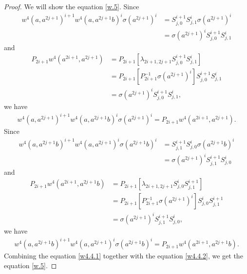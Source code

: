 \documentclass[a4paper,11pt]{amsart}
\numberwithin{equation}{section}
\begin{document}
\begin{proof}
We will show the equation \eqref{w.5}. Since
\begin{align*}
w^4(a,a^{2j+1})^{i+1} w^4(a,a^{2j+1}b)^i \sigma(a^{2j+1})^i&=S_{j,0}^{i+1} S_{j,1}^i \sigma(a^{2j+1})^i\\
&=\sigma(a^{2j+1})^i S_{j,0}^{i+1} S_{j,1}^i
\end{align*}
and
\begin{align*}
P_{2i+1} w^4(a^{2i+1},a^{2j+1})&=P_{2i+1} [\lambda_{2i+1,2j+1} S_{j,0}^{i+1} S_{j,1}^i]\\
&=P_{2i+1} [P_{2i+1}^{-1} \sigma(a^{2j+1})^i] S_{j,0}^{i+1} S_{j,1}^i\\
&=\sigma(a^{2j+1})^i S_{j,0}^{i+1} S_{j,1}^i,
\end{align*}
we have
\begin{align}
\label{w4.4.1} w^4(a,a^{2j+1})^{i+1} w^4(a,a^{2j+1}b)^i \sigma(a^{2j+1})^i=P_{2i+1}w^4(a^{2i+1},a^{2j+1}).
\end{align}
Since
\begin{align*}
w^4(a,a^{2j+1}b)^{i+1} w^4(a,a^{2j+1})^i \sigma(a^{2j+1}b)^i&=S_{j,1}^{i+1} S_{j,0}^i \sigma(a^{2j+1}b)^i\\
&=\sigma(a^{2j+1})^i S_{j,1}^{i+1} S_{j,0}^i
\end{align*}
and
\begin{align*}
P_{2i+1} w^4(a^{2i+1},a^{2j+1}b)&=P_{2i+1} [\lambda_{2i+1,2j+1} S_{j,0}^{i} S_{j,1}^{i+1}]\\
&=P_{2i+1} [P_{2i+1}^{-1} \sigma(a^{2j+1})^i] S_{j,0}^{i} S_{j,1}^{i+1}\\
&=\sigma(a^{2j+1})^i  S_{j,1}^{i+1} S_{j,0}^{i},
\end{align*}
we have
\begin{align}
\label{w4.4.2} w^4(a,a^{2j+1}b)^{i+1} w^4(a,a^{2j+1})^i \sigma(a^{2j+1}b)^i=P_{2i+1}w^4(a^{2i+1},a^{2j+1}b).
\end{align}
 Combining the equation \eqref{w4.4.1} together with the equation \eqref{w4.4.2}, we get the equation \eqref{w.5}.


\end{proof}
\end{document}
